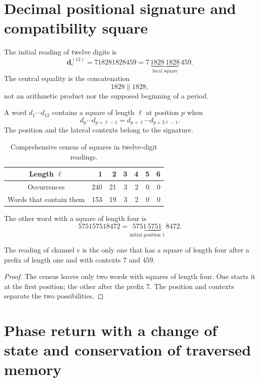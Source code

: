 \section{Decimal positional signature and compatibility square}

The initial reading of twelve digits is
\[
 \mathbf d_e^{(12)}
 =718281828459
 =7\,\underbrace{1828\,1828}_{\text{local square}}\,459.
\]
The central equality is the concatenation
\[
 1828\mathbin{\|}1828,
\]
not an arithmetic product nor the supposed beginning of a period.

\begin{definition}
A word \(d_1\cdots d_{12}\) contains a square of length \(\ell\)
at position \(p\) when
\[
 d_p\cdots d_{p+\ell-1}
 =d_{p+\ell}\cdots d_{p+2\ell-1}.
\]
The position and the lateral contexts belong to the signature.
\end{definition}

\begin{table}[htbp]
\centering
\caption{Comprehensive census of squares in twelve-digit readings.}
\label{gfp:b:tab:censo-cuadrados-e}
\begin{tabular}{c*{6}{r}}
\toprule
Length \(\ell\)&1&2&3&4&5&6\\
\midrule
Occurrences&240&21&3&2&0&0\\
Words that contain them&153&19&3&2&0&0\\
\bottomrule
\end{tabular}
\end{table}

The other word with a square of length four is
\[
 575157518472
 =\underbrace{5751\,5751}_{\text{initial position }1}\,8472.
\]

\begin{proposition}
\label{gfp:b:prop:cuadrado-posicional-e}
The reading of channel \(e\) is the only one that has a square of length
four after a prefix of length one and with contexts \(7\) and \(459\).
\end{proposition}

\begin{proof}
The census leaves only two words with squares of length four. One starts
it at the first position; the other after the prefix \(7\). The
position and contexts separate the two possibilities.
\end{proof}

\section{Phase return with a change of state and conservation of traversed memory}

